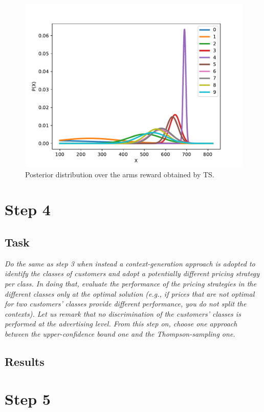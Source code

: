 \documentclass[12pt,a4paper]{report}
\begin{document}
\begin{figure}[H]
\centering
  \includegraphics[scale = 0.8, center]{3arms}
  \caption{Posterior distribution over the arms reward obtained by TS.}
\end{figure}

		\section{Step 4}
			\subsection{Task}
\textit{Do the same as step 3 when instead a context-generation approach is adopted to identify the classes of customers and adopt a potentially different pricing strategy per class. In doing that, evaluate the performance of the pricing strategies in the different classes only at the optimal solution (e.g., if prices that are not optimal for two customers’ classes provide different performance, you do not split the contexts). Let us remark that no discrimination of the customers’ classes is performed at the advertising level. From this step on, choose one approach between the upper-confidence bound one and the Thompson-sampling one.}
			\subsection{Results}
		\section{Step 5}
\end{document}
